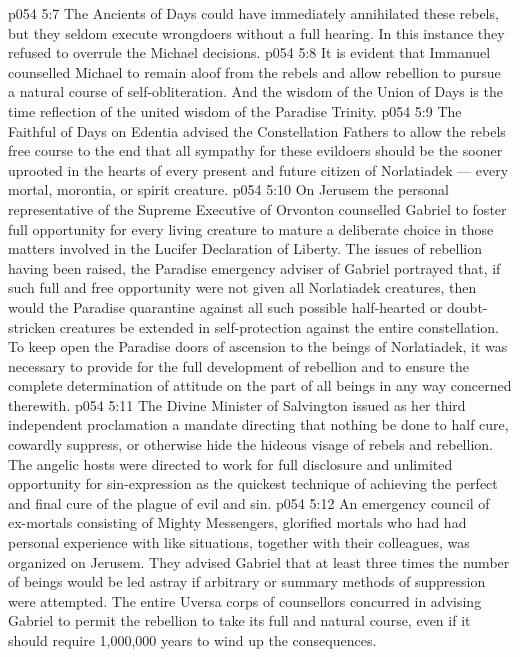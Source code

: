 \vs p054 5:7 \bibnobreakspace The Ancients of Days could have immediately annihilated these rebels, but they seldom execute wrongdoers without a full hearing. In this instance they refused to overrule the Michael decisions.
\vs p054 5:8 \bibnobreakspace It is evident that Immanuel counselled Michael to remain aloof from the rebels and allow rebellion to pursue a natural course of self\hyp{}obliteration. And the wisdom of the Union of Days is the time reflection of the united wisdom of the Paradise Trinity.
\vs p054 5:9 \bibnobreakspace The Faithful of Days on Edentia advised the Constellation Fathers to allow the rebels free course to the end that all sympathy for these evildoers should be the sooner uprooted in the hearts of every present and future citizen of Norlatiadek --- every mortal, morontia, or spirit creature.
\vs p054 5:10 \bibnobreakspace On Jerusem the personal representative of the Supreme Executive of Orvonton counselled Gabriel to foster full opportunity for every living creature to mature a deliberate choice in those matters involved in the Lucifer Declaration of Liberty. The issues of rebellion having been raised, the Paradise emergency adviser of Gabriel portrayed that, if such full and free opportunity were not given all Norlatiadek creatures, then would the Paradise quarantine against all such possible half\hyp{}hearted or doubt\hyp{}stricken creatures be extended in self\hyp{}protection against the entire constellation. To keep open the Paradise doors of ascension to the beings of Norlatiadek, it was necessary to provide for the full development of rebellion and to ensure the complete determination of attitude on the part of all beings in any way concerned therewith.
\vs p054 5:11 \bibnobreakspace The Divine Minister of Salvington issued as her third independent proclamation a mandate directing that nothing be done to half cure, cowardly suppress, or otherwise hide the hideous visage of rebels and rebellion. The angelic hosts were directed to work for full disclosure and unlimited opportunity for sin\hyp{}expression as the quickest technique of achieving the perfect and final cure of the plague of evil and sin.
\vs p054 5:12 \bibnobreakspace An emergency council of ex\hyp{}mortals consisting of Mighty Messengers, glorified mortals who had had personal experience with like situations, together with their colleagues, was organized on Jerusem. They advised Gabriel that at least three times the number of beings would be led astray if arbitrary or summary methods of suppression were attempted. The entire Uversa corps of counsellors concurred in advising Gabriel to permit the rebellion to take its full and natural course, even if it should require 1,000,000 years to wind up the consequences.
